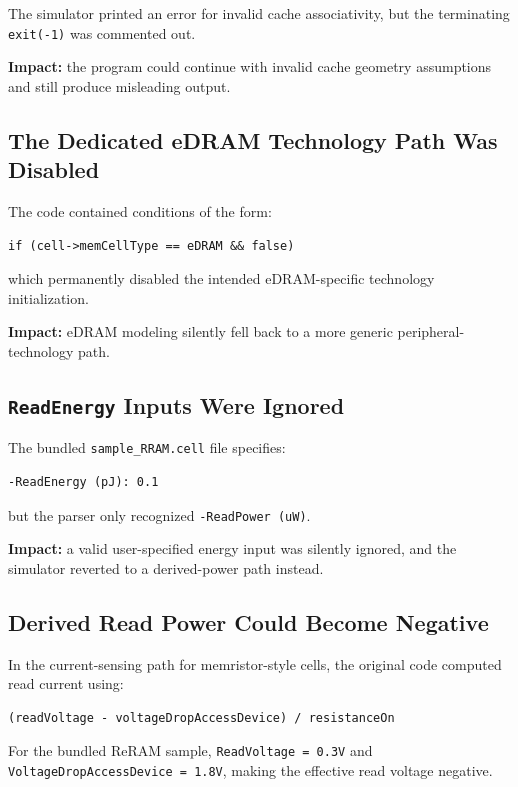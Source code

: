 \documentclass[11pt]{article}
\begin{document}
The simulator printed an error for invalid cache associativity, but the terminating \texttt{exit(-1)} was commented out.

\textbf{Impact:} the program could continue with invalid cache geometry assumptions and still produce misleading output.

\subsection{The Dedicated eDRAM Technology Path Was Disabled}

The code contained conditions of the form:

\begin{verbatim}
if (cell->memCellType == eDRAM && false)
\end{verbatim}

which permanently disabled the intended eDRAM-specific technology initialization.

\textbf{Impact:} eDRAM modeling silently fell back to a more generic peripheral-technology path.

\subsection{\texttt{ReadEnergy} Inputs Were Ignored}

The bundled \texttt{sample\_RRAM.cell} file specifies:

\begin{verbatim}
-ReadEnergy (pJ): 0.1
\end{verbatim}

but the parser only recognized \texttt{-ReadPower (uW)}.

\textbf{Impact:} a valid user-specified energy input was silently ignored, and the simulator reverted to a derived-power path instead.

\subsection{Derived Read Power Could Become Negative}

In the current-sensing path for memristor-style cells, the original code computed read current using:

\begin{verbatim}
(readVoltage - voltageDropAccessDevice) / resistanceOn
\end{verbatim}

For the bundled ReRAM sample, \texttt{ReadVoltage = 0.3V} and \texttt{VoltageDropAccessDevice = 1.8V}, making the effective read voltage negative.
\end{document}

